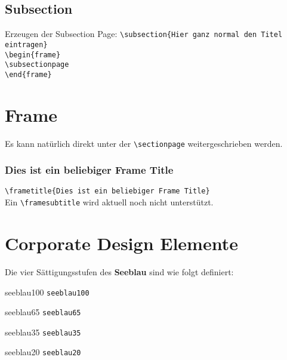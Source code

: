 \documentclass[rgb]{beamer}
\begin{document}
\subsection{Subsection}
\begin{frame}[t]
	\subsectionpage
	Erzeugen der Subsection Page:
	\vskip 18pt
	\texttt{\textbackslash subsection\{Hier ganz normal den Titel eintragen\}}\\
	\vskip 18pt
	\texttt{\textbackslash begin\{frame\}}\\
	\texttt{\textbackslash subsectionpage }\\
	\texttt{\textbackslash end\{frame\}}\\
\end{frame}

\section{Frame}

\begin{frame}[t]
	\sectionpage
	Es kann natürlich direkt unter der \texttt{\textbackslash sectionpage} weitergeschrieben werden.
\end{frame}

\begin{frame}[t]
	\frametitle{Dies ist ein beliebiger Frame Title}
	\vskip 18pt
	\texttt{\textbackslash frametitle\{Dies ist ein beliebiger Frame Title\}}\\
	\vskip 18pt
	Ein \texttt{\textbackslash framesubtitle} wird aktuell noch nicht unterstützt.
\end{frame}


\section{Corporate Design Elemente}

\begin{frame}[t]
	\sectionpage
	Die vier Sättigungsstufen des \textbf{Seeblau} sind wie folgt definiert:\\
	\vskip 12pt
	\begin{beamercolorbox}[wd=0.5\textwidth, ht=3ex, dp=2ex, center]{seeblau100}
		\texttt{seeblau100}
	\end{beamercolorbox}
	\vskip 12pt
	\begin{beamercolorbox}[wd=0.5\textwidth, ht=3ex, dp=2ex, center]{seeblau65}
		\texttt{seeblau65}
	\end{beamercolorbox}
	\vskip 12pt
	\begin{beamercolorbox}[wd=0.5\textwidth, ht=3ex, dp=2ex, center]{seeblau35}
		\texttt{seeblau35}
	\end{beamercolorbox}
	\vskip 12pt
	\begin{beamercolorbox}[wd=0.5\textwidth, ht=3ex, dp=2ex, center]{seeblau20}
		\texttt{seeblau20}
	\end{beamercolorbox}
\end{frame}
\end{document}
